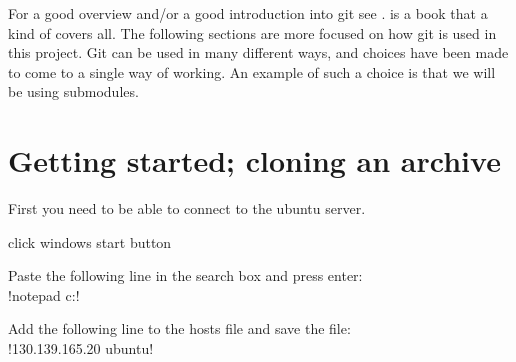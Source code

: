 %
%
%

For a good overview and/or a good introduction into git see \cite{Chacon}.
\cite{Chacon} is a book that a kind of covers all. The following sections are
more focused on how git is used in this project. Git can be used in many
different ways, and choices have been made to come to a single way of working.
An example of such a choice is that we will be using submodules.

\section{Getting started; cloning an archive \label{sec:git.start}}

First you need to be able to connect to the ubuntu server.

\begin{enumerate*}
\item click windows start button
\item Paste the following line in the search box and press enter:\\
      !notepad c:\Windows{}\Drivers\etc\hosts!
\item Add the following line to the hosts file and save the file:\\
      !130.139.165.20 ubuntu!
\end{enumerate*}

